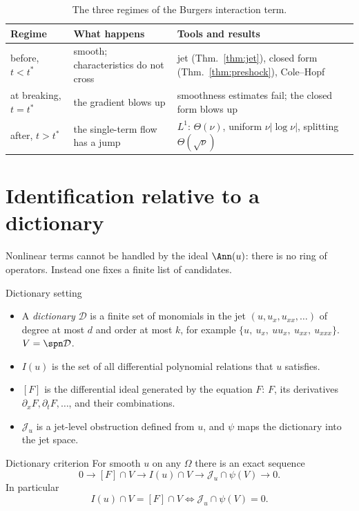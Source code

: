 \begin{table}[!htb]
\centering\small
\begin{tabular}{@{}L{3.0cm}L{4.8cm}L{6.4cm}@{}}
\toprule
Regime & What happens & Tools and results\\\midrule
before, $t<t^*$ & smooth; characteristics do not cross & jet (Thm.~\ref{thm:jet}), closed form (Thm.~\ref{thm:preshock}), Cole--Hopf\\
at breaking, $t=t^*$ & the gradient blows up & smoothness estimates fail; the closed form blows up\\
after, $t>t^*$ & the single-term flow has a jump & $L^1$: $\Theta(\nu)$, uniform $\nu|\log\nu|$, splitting $\Theta(\sqrt\nu)$\\
\bottomrule
\end{tabular}
\caption{The three regimes of the Burgers interaction term.}\label{tab:regimes}
\end{table}

\section{Identification relative to a dictionary}

Nonlinear terms cannot be handled by the ideal $\Ann(u)$: there is no ring of operators. Instead one fixes a finite list of candidates.

\begin{notebox}{Dictionary setting}
\begin{itemize}
\item A \emph{dictionary} $\mathcal D$ is a finite set of monomials in the jet $(u,u_x,u_{xx},\dots)$ of degree at most $d$ and order at most $k$, for example $\{u,\ u_x,\ uu_x,\ u_{xx},\ u_{xxx}\}$. $V=\spn\mathcal D$.
\item $I(u)$ is the set of all differential polynomial relations that $u$ satisfies.
\item $[F]$ is the differential ideal generated by the equation $F$: $F$, its derivatives $\partial_xF,\partial_tF,\dots$, and their combinations.
\item $\mathcal J_u$ is a jet-level obstruction defined from $u$, and $\psi$ maps the dictionary into the jet space.
\end{itemize}
\end{notebox}

\begin{theorem}{Dictionary criterion  \proved}\label{thm:dict}
For smooth $u$ on any $\Omega$ there is an exact sequence
\[
0\to[F]\cap V\to I(u)\cap V\to\mathcal J_u\cap\psi(V)\to0 .
\]
In particular
\[
I(u)\cap V=[F]\cap V\iff\mathcal J_u\cap\psi(V)=0 .
\]
\end{theorem}

